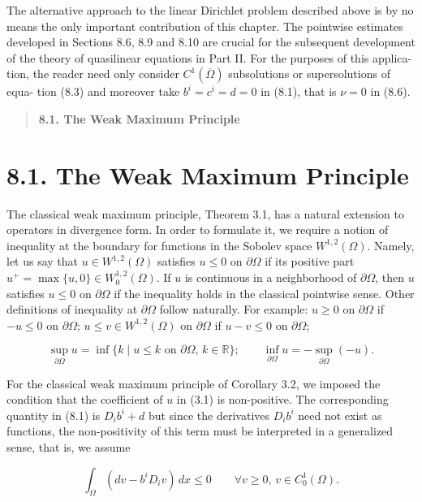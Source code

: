 The alternative approach to the linear Dirichlet problem described above is by
no means the only important contribution of this chapter. The pointwise estimates
developed in Sections 8.6, 8.9 and 8.10 are crucial for the subsequent development
of the theory of quasilinear equations in Part II. For the purposes of this applica-
tion, the reader need only consider $C^1(\overline{\Omega})$ subsolutions or supersolutions of equa-
tion (8.3) and moreover take $b^i=c^i=d=0$ in (8.1), that is $\nu=0$ in (8.6).



\begin{quote}
\textbf{8.1. The Weak Maximum Principle}
\end{quote}

\section*{8.1. The Weak Maximum Principle}

The classical weak maximum principle, Theorem 3.1, has a natural extension to operators in divergence form. In order to formulate it, we require a notion of inequality at the boundary for functions in the Sobolev space $W^{1,2}(\Omega)$. Namely, let us say that $u \in W^{1,2}(\Omega)$ satisfies $u \le 0$ on $\partial \Omega$ if its positive part $u^{+} = \max \{u, 0\} \in W_{0}^{1,2}(\Omega)$. If $u$ is continuous in a neighborhood of $\partial \Omega$, then $u$ satisfies $u \le 0$ on $\partial \Omega$ if the inequality holds in the classical pointwise sense. Other definitions of inequality at $\partial \Omega$ follow naturally. For example: $u \ge 0$ on $\partial \Omega$ if $-u \le 0$ on $\partial \Omega$; $u \le v \in W^{1,2}(\Omega)$ on $\partial \Omega$ if $u-v \le 0$ on $\partial \Omega$;

\[
\sup_{\partial \Omega} u = \inf \{k \mid u \le k \text{ on } \partial \Omega,\, k \in \mathbb{R}\}; \qquad
\inf_{\partial \Omega} u = -\sup_{\partial \Omega} (-u).
\]

For the classical weak maximum principle of Corollary 3.2, we imposed the condition that the coefficient of $u$ in (3.1) is non-positive. The corresponding quantity in (8.1) is $D_i b^i + d$ but since the derivatives $D_i b^i$ need not exist as functions, the non-positivity of this term must be interpreted in a generalized sense, that is, we assume

\begin{equation}\tag{8.8}
\int_{\Omega} (d v - b^i D_i v)\,dx \le 0 \qquad \forall v \ge 0,\, v \in C_0^1(\Omega).
\end{equation}

